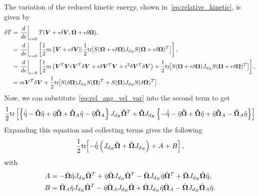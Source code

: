 The variation of the reduced kinetic energy, shown in~\cref{eq:relative_kinetic}, is given by
\begin{align}\label{eq:relative_kinetic_variation}
    \delta T &= \left. \frac{d }{d \epsilon} \right|_{\epsilon=0} T(\bm{V} + \epsilon \delta \bm{V}, \bm{\Omega} + \epsilon \delta \bm{\Omega}) , \nonumber \\
    &= \left. \frac{d }{d \epsilon} \right|_{\epsilon=0} \left[ \frac{1}{2} m \left\| \bm{V} + \epsilon \delta \bm{V} \right\| \frac{1}{2} \mathrm{tr}\negthickspace\left[  S(\bm{\Omega} + \epsilon \delta \bm{\Omega} ) J_{d_{R}} S(\bm{\Omega} + \epsilon \delta \bm{\Omega})^T  \right]  \right] , \nonumber\\
    &= \left. \frac{d }{d \epsilon} \right|_{\epsilon=0} \left[  \frac{1}{2} m \left( \bm{V}^T \bm{V} \epsilon \bm{V}^T \delta \bm{V} + \epsilon \delta \bm{V}^T \bm{V} + \epsilon^2 \delta \bm{V}^T \delta \bm{V} \right) + \frac{1}{2}\mathrm{tr}\negthickspace\left[  S(\bm{\Omega} + \epsilon \delta \bm{\Omega} ) J_{d_{R}} S(\bm{\Omega} + \epsilon \delta \bm{\Omega})^T  \right]  \right] , \nonumber \\
    &= m \bm{V}^T \delta \bm{V} + \frac{1}{2} \mathrm{tr}\negthickspace\left[  S(\delta \bm{\Omega}) J_{d_{R}} S(\bm{\Omega})^T + S(\bm{\Omega}) J_{d_{R}} S(\delta \bm{\Omega})^T \right] .
\end{align}
Now, we can substitute~\cref{eq:rel_ang_vel_var} into the second term to get
\begin{align*}
    \frac{1}{2} \mathrm{tr} \left[ \left\{ \dot{\hat{\eta}} - \bm{\hat\Omega} \hat{\eta} + \hat{\eta} \bm{\hat{\Omega}} +  \bm{\hat{\Omega}}_A \hat{\eta} - \hat{\eta} \bm{\hat{\Omega}}_A  \right\} J_{d_{R}} \bm{\hat{\Omega}}^T + \bm{\hat{\Omega}} J_{d_{R}} \left\{ -\dot{\hat{\eta}} - \hat{\eta} \bm{\hat{\Omega}} + \bm{\hat{\Omega}} \hat{\eta} + \hat{\eta} \bm{\hat{\Omega}}_A -  \bm{\hat{\Omega}}_A \hat{\eta} \right\} \right]
\end{align*}
Expanding this equation and collecting terms gives the following
\begin{align*}
    \frac{1}{2} \mathrm{tr}\negthickspace\left[  -\dot{\hat{\eta}}\left( J_{d_{R}} \hat{\bm{\Omega}} + \hat{\bm{\Omega}} J_{d_{R}} \right) + A + B  \right],
\end{align*}
with
\begin{align*}
    A &= - \hat{\bm{\Omega}} \hat{\eta} J_{d_{R}} \hat{\bm{\Omega}}^T + \hat{\eta} \hat{\bm{\Omega}} J_{d_R} \hat{\bm{\Omega}}^T - \hat{\bm{\Omega}}J_{d_R} \hat{\eta} \hat{\bm{\Omega}}^T + \hat{\bm{\Omega}} J_{d_R} \hat{\bm{\Omega}}\hat{\eta}   ,\\ 
    B &= \hat{\bm{\Omega}}_A \hat{\eta} J_{d_R} \hat{\bm{\Omega}}^T - \hat{\eta} \hat{\bm{\Omega}}_A J_{d_R} \hat{\bm{\Omega}} + \hat{\bm{\Omega}} J_{d_R} \hat{\eta} \hat{\bm{\Omega}}_A - \hat{\bm{\Omega}} J_{d_R} \hat{\bm{\Omega}}_A \hat{\eta} .
\end{align*}
